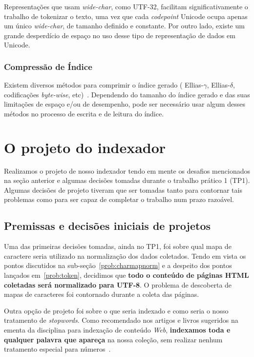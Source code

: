 \documentclass[10pt,twocolumn]{article}
\begin{document}
Representações que usam \emph{wide-char}, como UTF-32, facilitam
significativamente o trabalho de tokenizar o texto, uma vez que cada
\emph{codepoint} Unicode ocupa apenas um único \emph{wide-char}, de
tamanho definido e constante. Por outro lado, existe um grande
desperdício de espaço no uso desse tipo de representação de dados em
Unicode.



\subsubsection{Compressão de Índice}

Existem diversos métodos para comprimir o índice gerado (
Ellias-\(\gamma\), Ellias-\(\delta\), codificações
\emph{byte-wise}, etc)~\cite{moffat1999managing,moffat2006survey}.
Dependendo do tamanho do índice gerado e das suas limitações de espaço
e/ou de desempenho, pode ser necessário usar algum desses métodos no
processo de escrita e de leitura do índice.


\section{O projeto do indexador}

Realizamos o projeto de nosso indexador tendo em mente os desafios
mencionados na seção anterior e algumas decisões tomadas durante o
trabalho prático 1 (TP1). Algumas decisões de projeto tiveram que
ser tomadas tanto para contornar tais problemas como para ser capaz de
completar o trabalho num prazo razoável.


\subsection{Premissas e decisões iniciais de projetos}

Uma das primeiras decisões tomadas, ainda no TP1, foi sobre qual mapa de
caractere seria utilizado na normalização dos dados coletados.  Tendo em
vista os pontos discutidos na sub-seção~\ref{prob:charmapnorm} e a
despeito dos pontos lançados em~\ref{prob:token}, decidimos que
\textbf{todo o conteúdo de páginas HTML coletadas será normalizado para
UTF-8}. O problema de descoberta de mapas de caracteres foi contornado
durante a coleta das páginas.

Outra opção de projeto foi sobre o que seria indexado e como seria o
nosso tratamento de \emph{stopwords}. Como recomendado nos artigos e
livros sugeridos na ementa da disciplina para indexação de conteúdo
\emph{Web}, \textbf{indexamos toda e qualquer palavra que apareça} na
nossa coleção, sem realizar nenhum tratamento especial para
números~\cite{moffat1999managing}.
\end{document}
